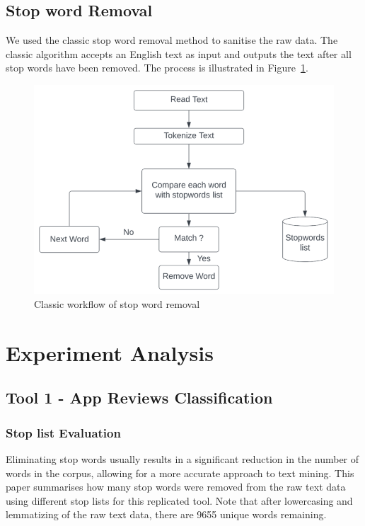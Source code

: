 \documentclass[conference]{IEEEtran}
\begin{document}
\begin{sloppy}
\subsection{Stop word Removal}

We used the classic stop word removal method to sanitise the raw data. The classic algorithm accepts an English text as input and outputs the text after all stop words have been removed. The process is illustrated in Figure~\ref{fig:workflow}. 

\begin{figure}
    \centering
    \includegraphics[width=\linewidth]{workflow.png}
    \caption{Classic workflow of stop word removal}
    \label{fig:workflow}
\end{figure}

\section{Experiment Analysis}

\subsection{Tool 1 - App Reviews Classification}

\subsubsection{Stop list Evaluation}

Eliminating stop words usually results in a significant reduction in the number of words in the corpus, allowing for a more accurate approach to text mining. This paper summarises how many stop words were removed from the raw text data using different stop lists for this replicated tool. Note that after lowercasing and lemmatizing of the raw text data, there are 9655 unique words remaining. 


\end{sloppy}
\end{document}
